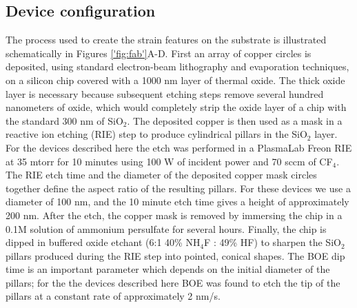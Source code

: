\documentclass[edeposit,fullpage,draftthesis]{uiucthesis2009}
\begin{document}
    \subsection{Device configuration}
            
           
          
           
            The process used to create the strain features on the substrate is illustrated schematically in Figures \ref{'fig:fab'}A-D.
            First an array of copper circles is deposited, using standard electron-beam lithography and evaporation techniques, 
            on a silicon chip covered with a 1000 nm layer of thermal oxide. 
            The thick oxide layer is necessary because subsequent etching steps remove several hundred nanometers of oxide, 
            which would completely strip the oxide layer of a chip with the standard 300 nm of SiO$_2$.
            The deposited copper is then used as a mask in a reactive ion etching 
            (RIE) step to produce cylindrical pillars in the SiO$_2$ layer. For the devices described here the etch was performed in 
            a PlasmaLab Freon RIE at 35 mtorr for 10 minutes 
            using 100 W of incident power and 70 sccm of CF$_4$. 
            The RIE etch time and the diameter of the deposited copper mask circles together define the aspect ratio of the resulting 
            pillars. For these devices we use a diameter of 100 nm, and the 10 minute etch time gives a height of approximately  
            200 nm.
            After the etch, the copper mask is removed by immersing the chip 
            in a 0.1M solution of ammonium persulfate for several hours. Finally, the chip is dipped in buffered oxide etchant 
            (6:1 40\% NH$_4$F : 49\% HF) to sharpen the SiO$_2$ pillars produced during the RIE step into pointed, conical shapes. 
            The BOE dip time is an important parameter which depends on the initial diameter of the pillars; for the the devices
            described here BOE was found to etch the tip of the pillars at a constant rate of approximately 2 nm/s. 
            
\end{document}
